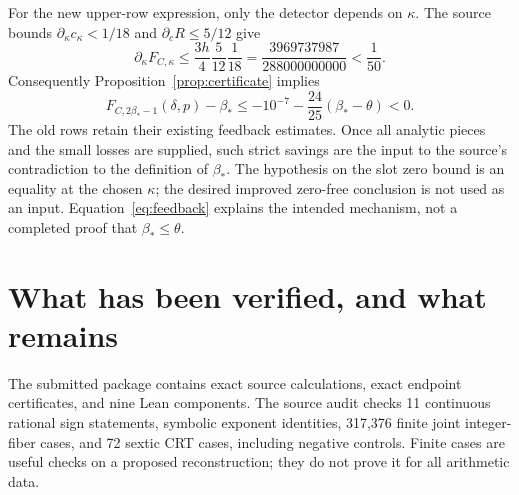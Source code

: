 \documentclass[11pt]{article}
\theoremstyle{definition}
\begin{document}
For the new upper-row expression, only the detector depends on $\kappa$.
The source bounds $\partial_\kappa c_\kappa<1/18$ and
$\partial_cR\le5/12$ give
\[
 \partial_\kappa F_{C,\kappa}
 \le\frac{3h}{4}\frac5{12}\frac1{18}
 =\frac{3969737987}{288000000000}<\frac1{50}.
\]
Consequently Proposition~\ref{prop:certificate} implies
\begin{equation}\label{eq:feedback}
 F_{C,2\beta_*-1}(\delta,p)-\beta_*
 \le-10^{-7}-\frac{24}{25}(\beta_*-\theta)<0.
\end{equation}
The old rows retain their existing feedback estimates. Once all analytic
pieces and the small losses are supplied, such strict savings are the
input to the source's contradiction to the definition of $\beta_*$.
The hypothesis on the slot zero bound is an equality at the chosen
$\kappa$; the desired improved zero-free conclusion is not used as an
input. Equation~\eqref{eq:feedback} explains the intended mechanism,
not a completed proof that $\beta_*\le\theta$.

\section{What has been verified, and what remains}\label{sec:gaps}

The submitted package contains exact source calculations, exact endpoint
certificates, and nine Lean components. The source audit checks 11
continuous rational sign statements, symbolic exponent identities,
317,376 finite joint integer-fiber cases, and 72 sextic CRT cases,
including negative controls. Finite cases are useful checks on a
proposed reconstruction; they do not prove it for all arithmetic data.
\end{document}
